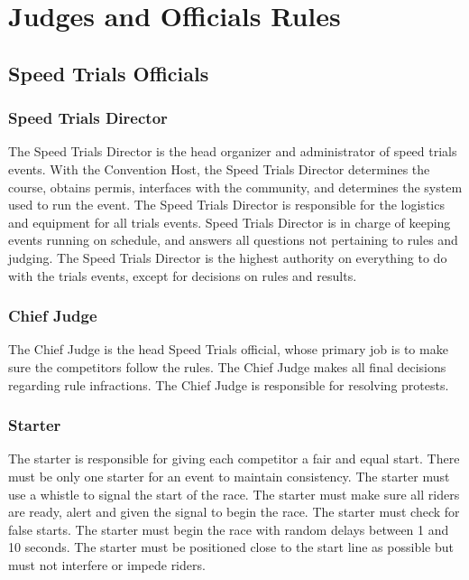 \chapter{Judges and Officials Rules}

\section{Speed Trials Officials}

\subsection{Speed Trials Director}

The Speed Trials Director is the head organizer and administrator of speed trials events.
With the Convention Host, the Speed Trials Director determines the course, obtains permis, interfaces with the community, and determines the system used to run the event.
The Speed Trials Director is responsible for the logistics and equipment for all trials events.
Speed Trials Director is in charge of keeping events running on schedule, and answers all questions not pertaining to rules and judging.
The Speed Trials Director is the highest authority on everything to do with the trials events, except for decisions on rules and results.

\subsection{Chief Judge}

The Chief Judge is the head Speed Trials official, whose primary job is to make sure the competitors follow the rules.
The Chief Judge makes all final decisions regarding rule infractions.
The Chief Judge is responsible for resolving protests.

\subsection{Starter}
The starter is responsible for giving each competitor a fair and equal start.
There must be only one starter for an event to maintain consistency.
The starter must use a whistle to signal the start of the race.
The starter must make sure all riders are ready, alert and given the signal to begin the race.
The starter must check for false starts.
The starter must begin the race with random delays between 1 and 10 seconds.
The starter must be positioned close to the start line as possible but must not interfere or impede riders.

